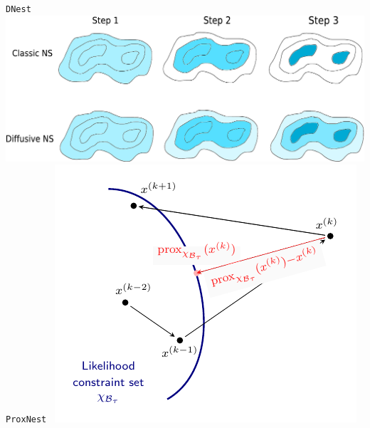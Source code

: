 \documentclass[aspectratio=169]{beamer}
\begin{document}
\begin{frame}
\begin{columns}[t]
        \texttt{DNest}~
        \includegraphics[width=\textwidth]{figures/dnest}
        \texttt{ProxNest}~
        \includegraphics[width=\textwidth]{figures/proxnest_diagram}
        \vfill
    \end{columns}
\end{frame}
\end{document}
